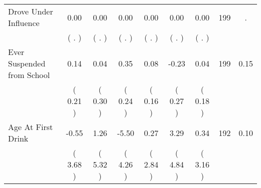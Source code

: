 \begin{tabular}{lcccccccc}
Drove Under Influence &      0.00 &      0.00 &      0.00 &      0.00 &      0.00 &      0.00 & 199 &          . \\ 
 & (        . ) & (        . ) & (        . ) & (        . ) & (        . ) & (        . ) & \\
Ever Suspended from School &      0.14 &      0.04 &      0.35 &      0.08 &     -0.23 &      0.04 & 199 &       0.15 \\ 
 & (     0.21 ) & (     0.30 ) & (     0.24 ) & (     0.16 ) & (     0.27 ) & (     0.18 ) & \\
Age At First Drink &     -0.55 &      1.26 &     -5.50 &      0.27 &      3.29 &      0.34 & 192 &       0.10 \\ 
 & (     3.68 ) & (     5.32 ) & (     4.26 ) & (     2.84 ) & (     4.84 ) & (     3.16 ) & \\
\bottomrule
\end{tabular}
